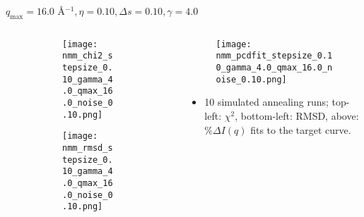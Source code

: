 \documentclass{beamer}
\begin{document}
\begin{frame}{$ q_{\textrm{max}}=16.0 $ \AA $^{-1}, \eta=0.10, \Delta s=0.10, \gamma=4.0$}
	\begin{columns}
		\begin{column}{.5\textwidth}
			\begin{figure}[H]
			\centering
			\begin{subfigure}[b]{\textwidth}
				\centering
				\texttt{[image: nmm\_chi2\_stepsize\_0.10\_gamma\_4.0\_qmax\_16.0\_noise\_0.10.png]}
				\label{fig:}
			\end{subfigure}
			\begin{subfigure}[b]{\textwidth}
				\centering
				\texttt{[image: nmm\_rmsd\_stepsize\_0.10\_gamma\_4.0\_qmax\_16.0\_noise\_0.10.png]}
				\label{fig:}
			\end{subfigure}
			\end{figure}
		\end{column}
		\begin{column}{.5\textwidth}
			\begin{figure}[H]
				\centering
				\texttt{[image: nmm\_pcdfit\_stepsize\_0.10\_gamma\_4.0\_qmax\_16.0\_noise\_0.10.png]}
				\label{fig:}
			\end{figure}
			\begin{itemize}
				\item 10 simulated annealing runs; top-left: $\chi^2$, bottom-left: RMSD, above: $\%\Delta I(q)$ fits to the target curve.
			\end{itemize}
		\end{column}
	\end{columns}
\end{frame}
 
\end{document}
